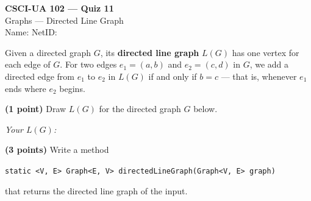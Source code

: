 \documentclass[11pt]{article}
\begin{document}
\begin{center}
  {\Large \textbf{CSCI-UA 102 --- Quiz 11}} \\[4pt]
  {\large Graphs --- Directed Line Graph} \\[3pt]
  Name: \underline{\hspace{2.5in}} \quad NetID: \underline{\hspace{1.5in}}
\end{center}

\medskip

\noindent Given a directed graph $G$, its \textbf{directed line graph} $L(G)$ has one vertex for each edge of $G$. For two edges $e_1 = (a, b)$ and $e_2 = (c, d)$ in $G$, we add a directed edge from $e_1$ to $e_2$ in $L(G)$ if and only if $b = c$ --- that is, whenever $e_1$ ends where $e_2$ begins.

\medskip

\noindent\textbf{(1 point)} Draw $L(G)$ for the directed graph $G$ below.

\begin{minipage}[t]{0.30\textwidth}
  \vspace{2pt}
  \centering
\end{minipage}%
\hfill
\begin{minipage}[t]{0.65\textwidth}
  \vspace{2pt}
  \textit{Your $L(G)$:}
  \vspace{1.1in}
\end{minipage}

\medskip

\noindent\textbf{(3 points)} Write a method
\begin{center}
\texttt{static <V, E> Graph<E, V> directedLineGraph(Graph<V, E> graph)}
\end{center}
that returns the directed line graph of the input.

\smallskip
\end{document}
